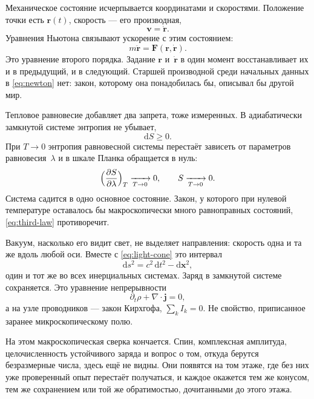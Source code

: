 Механическое состояние исчерпывается координатами и скоростями.
Положение точки есть $\mathbf{r}(t)$, скорость --- его производная,
\begin{equation}
  \mathbf{v} = \dot{\mathbf{r}}.
  \label{eq:velocity}
\end{equation}
Уравнения Ньютона связывают ускорение с этим состоянием:
\begin{equation}
  m\ddot{\mathbf{r}} = \mathbf{F}(\mathbf{r},\dot{\mathbf{r}}).
  \label{eq:newton}
\end{equation}
Это уравнение второго порядка.
Задание $\mathbf{r}$ и~$\dot{\mathbf{r}}$ в один момент восстанавливает их и в предыдущий, и в следующий.
Старшей производной среди начальных данных в \eqref{eq:newton} нет:
закон, которому она понадобилась бы, описывал бы другой мир.

Тепловое равновесие добавляет два запрета, тоже измеренных.
В адиабатически замкнутой системе энтропия не убывает,
\begin{equation}
  \mathrm{d}S \ge 0.
  \label{eq:second-law}
\end{equation}
При $T\to 0$ энтропия равновесной системы перестаёт зависеть от параметров равновесия~$\lambda$
и в шкале Планка обращается в нуль:
\begin{equation}
  \Bigl(\frac{\partial S}{\partial\lambda}\Bigr)_{T}
    \xrightarrow[T\to 0]{} 0,
  \qquad
  S \xrightarrow[T\to 0]{} 0.
  \label{eq:third-law}
\end{equation}
Система садится в одно основное состояние.
Закон, у которого при нулевой температуре оставалось бы макроскопически много
равноправных состояний, \eqref{eq:third-law} противоречит.

Вакуум, насколько его видит свет, не выделяет направления:
скорость одна и та же вдоль любой оси.
Вместе с \eqref{eq:light-cone} это интервал
\begin{equation}
  \mathrm{d}s^2 = c^2\,\mathrm{d}t^2 - \mathrm{d}\mathbf{x}^2,
  \label{eq:interval}
\end{equation}
один и тот же во всех инерциальных системах.
Заряд в замкнутой системе сохраняется.
Это уравнение непрерывности
\begin{equation}
  \partial_t\rho + \nabla\cdot\mathbf{j} = 0,
  \label{eq:continuity}
\end{equation}
а на узле проводников --- закон Кирхгофа, $\sum_k I_k = 0$.
Не свойство, приписанное заранее микроскопическому полю.

На этом макроскопическая сверка кончается.
Спин, комплексная амплитуда, целочисленность устойчивого заряда
и вопрос о том, откуда берутся безразмерные числа, здесь ещё не видны.
Они появятся на том этаже, где без них уже проверенный опыт перестаёт получаться,
и каждое окажется тем же конусом, тем же сохранением или той же обратимостью, дочитанными до этого этажа.

